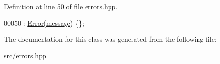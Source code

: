 Definition at line \hyperlink{errors_8hpp_source_l00050}{50} of file \hyperlink{errors_8hpp_source}{errors.\+hpp}.


\begin{DoxyCode}
00050 : \hyperlink{classError_accd611f3ddae0828adeb6ca251113ffd}{Error}(\hyperlink{classError_aa4713ef3ee9c3c0da43a54b01949510d}{message}) \{\};
\end{DoxyCode}


The documentation for this class was generated from the following file\+:\begin{DoxyCompactItemize}
\item 
src/\hyperlink{errors_8hpp}{errors.\+hpp}\end{DoxyCompactItemize}
